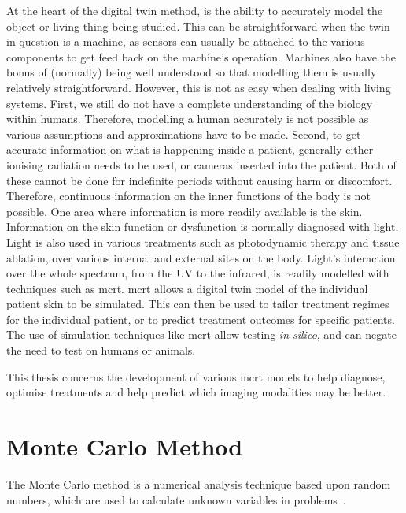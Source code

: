 At the heart of the digital twin method, is the ability to accurately model the object or living thing being studied.
This can be straightforward when the twin in question is a machine, as sensors can usually be attached to the various components to get feed back on the machine's operation.
Machines also have the bonus of (normally) being well understood so that modelling them is usually relatively straightforward.
However, this is not as easy when dealing with living systems.
First, we still do not have a complete understanding of the biology within humans.
Therefore, modelling a human accurately is not possible as various assumptions and approximations have to be made.
Second, to get accurate information on what is happening inside a patient, generally either ionising radiation needs to be used, or cameras inserted into the patient.
Both of these cannot be done for indefinite periods without causing harm or discomfort.
Therefore, continuous information on the inner functions of the body is not possible.
One area where information is more readily available is the skin.
Information on the skin function or dysfunction is normally diagnosed with light.
Light is also used in various treatments such as photodynamic therapy and tissue ablation, over various internal and external sites on the body.
Light's interaction over the whole spectrum, from the UV to the infrared, is readily modelled with techniques such as \gls*{mcrt}.
\Gls*{mcrt} allows a digital twin model of the individual patient skin to be simulated.
This can then be used to tailor treatment regimes for the individual patient, or to predict treatment outcomes for specific patients.
The use of simulation techniques like \gls*{mcrt} allow testing \textit{in-silico}, and can negate the need to test on humans or animals.

\medskip
This thesis concerns the development of various \gls*{mcrt} models to help diagnose, optimise treatments and help predict which imaging modalities may be better.


\section{Monte Carlo Method}\label{sec:mcmethod}
The Monte Carlo method is a numerical analysis technique based upon random numbers, which are used to calculate unknown variables in problems~\cite{cashwell1959practical,rogers1990monte}. 

